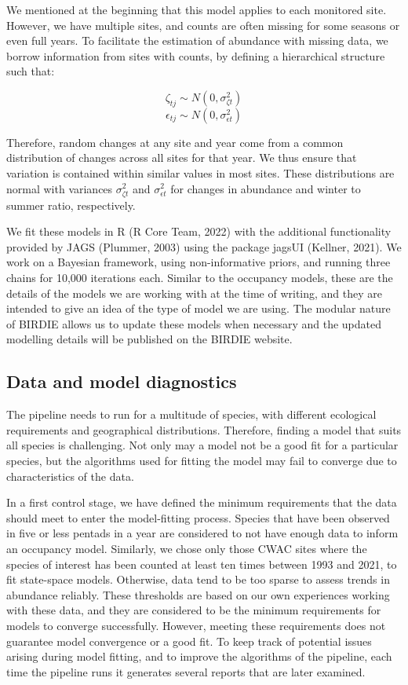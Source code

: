 \documentclass[utf8]{frontiersSCNS}
\begin{document}
We mentioned at the beginning that this model applies to each monitored
site. However, we have multiple sites, and counts are often missing for
some seasons or even full years. To facilitate the estimation of
abundance with missing data, we borrow information from sites with
counts, by defining a hierarchical structure such that:

\[\zeta_{tj} \sim N(0, \sigma^2_{\zeta t})\]
\[\epsilon_{tj} \sim N(0, \sigma^2_{\epsilon t})\]

Therefore, random changes at any site and year come from a common
distribution of changes across all sites for that year. We thus ensure
that variation is contained within similar values in most sites. These
distributions are normal with variances \(\sigma^2_{\zeta t}\) and
\(\sigma^2_{\epsilon t}\) for changes in abundance and winter to summer
ratio, respectively.

We fit these models in R (R Core Team, 2022) with the additional
functionality provided by JAGS (Plummer, 2003) using the package jagsUI
(Kellner, 2021). We work on a Bayesian framework, using non-informative
priors, and running three chains for 10,000 iterations each. Similar to
the occupancy models, these are the details of the models we are working
with at the time of writing, and they are intended to give an idea of
the type of model we are using. The modular nature of BIRDIE allows us
to update these models when necessary and the updated modelling details
will be published on the BIRDIE website.

\hypertarget{data-and-model-diagnostics}{%
\subsection*{Data and model
diagnostics}\label{data-and-model-diagnostics}}

The pipeline needs to run for a multitude of species, with different
ecological requirements and geographical distributions. Therefore,
finding a model that suits all species is challenging. Not only may a
model not be a good fit for a particular species, but the algorithms
used for fitting the model may fail to converge due to characteristics
of the data.

In a first control stage, we have defined the minimum requirements that
the data should meet to enter the model-fitting process. Species that
have been observed in five or less pentads in a year are considered to
not have enough data to inform an occupancy model. Similarly, we chose
only those CWAC sites where the species of interest has been counted at
least ten times between 1993 and 2021, to fit state-space models.
Otherwise, data tend to be too sparse to assess trends in abundance
reliably. These thresholds are based on our own experiences working with
these data, and they are considered to be the minimum requirements for
models to converge successfully. However, meeting these requirements
does not guarantee model convergence or a good fit. To keep track of
potential issues arising during model fitting, and to improve the
algorithms of the pipeline, each time the pipeline runs it generates
several reports that are later examined.
\end{document}

